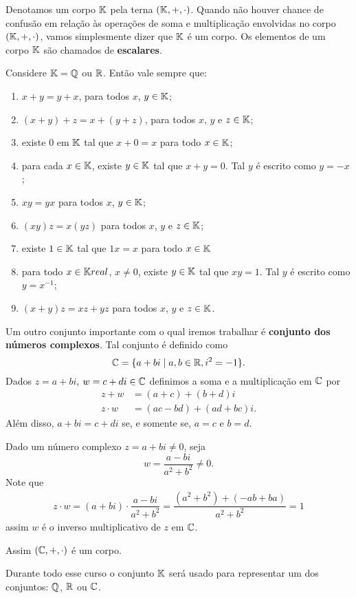 \documentclass{beamer}
\begin{document}
    \begin{frame}
        Denotamos um corpo $\mathbb{K}$ pela terna $(\mathbb{K}, +, \cdot)$. Quando n\~ao houver chance de confus\~ao em rela\c{c}\~ao \`as opera\c{c}\~oes de soma e multiplica\c{c}\~ao envolvidas no corpo $(\mathbb{K}, +, \cdot)$, vamos simplesmente dizer que $\mathbb{K}$ \'e um corpo. Os elementos de um corpo $\mathbb{K}$ s\~ao chamados de \textbf{escalares}.
    \end{frame}
    
    \begin{frame}
    
        Considere $\mathbb{K} = \mathbb{Q}$ ou $\mathbb{R}$. Então vale sempre que:
        \begin{enumerate}[label={\roman*})]
	    \item $x + y = y + x$, para todos $x$, $y \in \mathbb{K}$;
            \item $(x + y) + z = x + (y + z)$, para todos $x$, $y$ e $z \in \mathbb{K}$;
            \item existe $0$ em $\mathbb{K}$ tal que $x + 0 = x$ para todo $x \in \mathbb{K}$;
            \item para cada $x \in \mathbb{K}$, existe $y \in \mathbb{K}$ tal que $x + y = 0$. Tal $y$ é escrito como $y = -x$;
            \item $xy = yx$ para todos $x$, $y \in \mathbb{K}$;
            \item $(xy)z = x(yz)$ para todos $x$, $y$ e $z \in \mathbb{K}$;
            \item existe $1 \in \mathbb{K}$ tal que $1x = x$ para todo $x \in \mathbb{K}$
            \item para todo $x \in \mathbb{K}real$, $x \ne 0$, existe $y \in \mathbb{K}$ tal que $xy =1$. Tal $y$ é escrito como $y = x^{-1}$;
            \item $(x + y)z = xz + yz$ para todos $x$, $y$ e $z \in \mathbb{K}$.
        \end{enumerate}
    \end{frame}
    \begin{frame}
        Um outro conjunto importante com o qual iremos trabalhar é \textbf{conjunto dos números complexos}. Tal conjunto \'e definido como
        \[
    	    \mathbb{C} = \{a + bi \mid a, b \in \mathbb{R}, i^2 = -1\}.
        \]
        Dados $z = a + bi$, $w = c + di \in \mathbb{C}$ definimos a soma e a multiplica\c{c}\~ao em $\mathbb{C}$ por
        \begin{align*}
	    z + w &= (a + c) + (b + d)i\\
            z\cdot w &= (ac - bd) + (ad + bc)i.
        \end{align*}
        Al\'em disso, $a + bi = c + di$ se, e somente se, $a = c$ e $b = d$.

        Dado um n\'umero complexo $z = a + bi \ne 0$, seja
        \[
	    w = \dfrac{a - bi}{a^2 + b^2} \ne 0.
        \]
        Note que
        \begin{align*}
            z\cdot w = (a + bi)\cdot \dfrac{a - bi}{a^2 + b^2} = \dfrac{(a^2 + b^2) + (-ab + ba)}{a^2 + b^2} = 1
        \end{align*}
        assim $w$ \'e o inverso multiplicativo de $z$ em $\mathbb{C}$.
    \end{frame}
    
    \begin{frame}
        Assim $(\mathbb{C}, +, \cdot)$ é um corpo.

        Durante todo esse curso o conjunto $\mathbb{K}$ será usado para representar um dos conjuntos: $\mathbb{Q}$, $\mathbb{R}$ ou $\mathbb{C}$.
    \end{frame}
\end{document}
